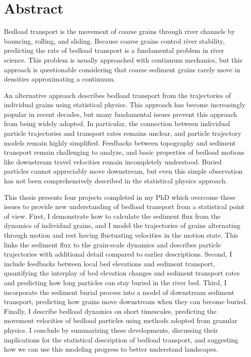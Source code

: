 
\chapter{Abstract}

Bedload transport is the movement of coarse grains through river channels by bouncing, rolling, and sliding. Because coarse grains control river stability, predicting the rate of bedload transport is a fundamental problem in river science. This problem is usually approached with continuum mechanics, but this approach is questionable considering that coarse sediment grains rarely move in densities approximating a continuum.

An alternative approach describes bedload transport from the trajectories of individual grains using statistical physics. This approach has become increasingly popular in recent decades, but many fundamental issues prevent this approach from being widely adopted. In particular, the connection between individual particle trajectories and transport rates remains unclear, and particle trajectory models remain highly simplified. Feedbacks between topography and sediment transport remain challenging to analyze, and basic properties of bedload motions like downstream travel velocities remain incompletely understood. Buried particles cannot appreciably move downstream, but even this simple observation has not been comprehensively described in the statistical physics approach.

This thesis presents four projects completed in my PhD which overcome these issues to provide new understanding of bedload transport from a statistical point of view. First, I demonstrate how to calculate the sediment flux from the dynamics of individual grains, and I model the trajectories of grains alternating through motion and rest having fluctuating velocities in the motion state. This links the sediment flux to the grain-scale dynamics and describes particle trajectories with additional detail compared to earlier descriptions. Second, I include feedbacks between local bed elevations and sediment transport, quantifying the interplay of bed elevation changes and sediment transport rates and predicting how long particles can stay buried in the river bed. Third, I incorporate the sediment burial process into a model of downstream sediment transport, predicting how grains move downstream when they can become buried. Finally, I describe bedload dynamics on short timescales, predicting the movement velocities of bedload particles using methods adopted from granular physics. I conclude by summarizing these developments, discussing their implications for the statistical description of bedload transport, and suggesting how we can use this modeling progress to better understand landscapes.

